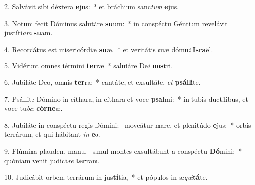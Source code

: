 2. Salvávit sibi déxtera \textbf{e}jus:~*  et bráchium sanc\textit{tum} \textbf{e}jus.\

3. Notum fecit Dóminus salutáre \textbf{su}um:~*  in conspéctu Géntium revelávit justíti\textit{am} \textbf{su}am.\

4. Recordátus est misericórdiæ \textbf{su}æ,~*  et veritátis suæ dómu\textit{i} \textbf{Is}\textbf{ra}ël.\

5. Vidérunt omnes términi \textbf{ter}ræ~*  salutáre De\textit{i} \textbf{nos}tri.\

6. Jubiláte Deo, omnis \textbf{ter}ra:~*  cantáte, et exsultáte, \textit{et} \textbf{psál}\textbf{li}te.\

7. Psállite Dómino in cíthara, in cíthara et voce \textbf{psal}mi:~*  in tubis ductílibus, et voce tu\textit{bæ} \textbf{cór}\textbf{ne}æ.\

8. Jubiláte in conspéctu regis Dómini: \dag\  moveátur mare, et plenitúdo \textbf{e}jus:~*  orbis terrárum, et qui hábitant \textit{in} \textbf{e}o.\

9. Flúmina plaudent manu, \dag\  simul montes exsultábunt a conspéctu \textbf{Dó}mini:~*  quóniam venit judicá\textit{re} \textbf{ter}ram.\

10. Judicábit orbem terrárum in jus\textbf{tí}tia,~*  et pópulos in æ\textit{qui}\textbf{tá}te.\

